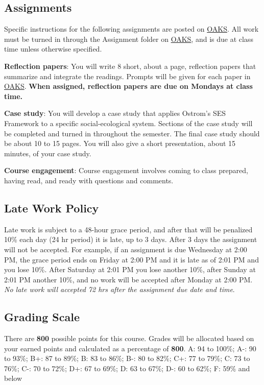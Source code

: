 \hypertarget{assignments}{%
\subsection{Assignments}\label{assignments}}

Specific instructions for the following assignments are posted on
\href{https://lms.cofc.edu/d2l/home}{OAKS}. All work must be turned in
through the Assignment folder on \href{https://lms.cofc.edu}{OAKS}, and
is due at class time unless otherwise specified.

\vspace{0.10in}

\noindent \textbf{Reflection papers}: You will write 8 short, about a
page, reflection papers that summarize and integrate the readings.
Prompts will be given for each paper in
\href{https://lms.cofc.edu}{OAKS}. \textbf{When assigned, reflection
papers are due on Mondays at class time.}

\vspace{0.10in}

\noindent \textbf{Case study}: You will develop a case study that
applies Ostrom's SES Framework to a specific social-ecological system.
Sections of the case study will be completed and turned in throughout
the semester. The final case study should be about 10 to 15 pages. You
will also give a short presentation, about 15 minutes, of your case
study.

\vspace{0.10in}

\noindent \textbf{Course engagement}: Course engagement involves coming
to class prepared, having read, and ready with questions and comments.

\hypertarget{late-work-policy}{%
\subsection{Late Work Policy}\label{late-work-policy}}

Late work is subject to a 48-hour grace period, and after that will be
penalized 10\% each day (24 hr period) it is late, up to 3 days. After 3
days the assignment will not be accepted. For example, if an assignment
is due Wednesday at 2:00 PM, the grace period ends on Friday at 2:00 PM
and it is late as of 2:01 PM and you lose 10\%. After Saturday at 2:01
PM you lose another 10\%, after Sunday at 2:01 PM another 10\%, and no
work will be accepted after Monday at 2:00 PM. \emph{No late work will
accepted 72 hrs after the assignment due date and time}.

\hypertarget{grading-scale}{%
\subsection{Grading Scale}\label{grading-scale}}

There are \textbf{800} possible points for this course. Grades will be
allocated based on your earned points and calculated as a percentage of
\textbf{800}. A: 94 to 100\%; A-: 90 to 93\%; B+: 87 to 89\%; B: 83 to
86\%; B-: 80 to 82\%; C+: 77 to 79\%; C: 73 to 76\%; C-: 70 to 72\%; D+:
67 to 69\%; D: 63 to 67\%; D-: 60 to 62\%; F: 59\% and below

